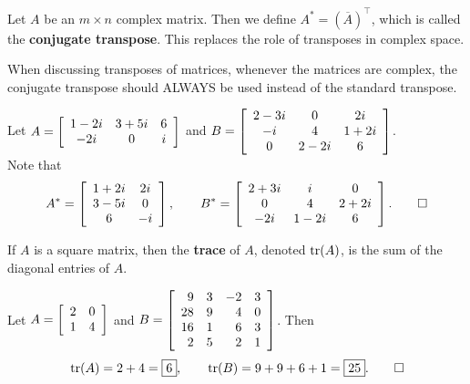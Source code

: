 \begin{Def} Let $A$ be an $m\times n$ complex matrix. Then we define $A^* = (\overline{A})^\top $, which is called the \textbf{conjugate transpose}. This replaces the role of transposes in complex space.
\end{Def}\vs

When discussing transposes of matrices, whenever the matrices are complex, the conjugate transpose should ALWAYS be used instead of the standard transpose.\\

\begin{Exam} Let $A = \mtx{ccc}{ 1-2i & 3+5i & 6 \\ -2i & 0 & i}$ and  $B = \mtx{ccc}{2-3i & 0 & 2i \\ -i & 4 & 1+2i \\ 0 & 2-2i & 6}$.\\

 Note that 
\[A^* = \mtx{cc}{1+2i & 2i \\ 3-5i & 0 \\ 6 & -i},\qquad B^* =  \mtx{ccc}{2+3i & i & 0 \\ 0 & 4 & 2+2i \\ -2i & 1-2i & 6}. \qedhere \]
\end{Exam}\vs

\begin{Def} If $A$ is a square matrix, then the \textbf{trace} of $A$, denoted $\tr(A)$, is the sum of the diagonal entries of $A$.
\end{Def}\vs

\begin{Exam} Let $A = \mtx{rr}{2&0\\1&4}$ and $B = \mtx{rrrr}{9&3&-2&3\\28&9&4&0\\16&1&6&3\\2&5&2&1}$. Then 
\[\tr(A) = 2+4 = \fbox{$6$},\qquad \tr(B) =9+9+6+1 = \fbox{$25$}.\qedhere\]
\end{Exam}\vs


